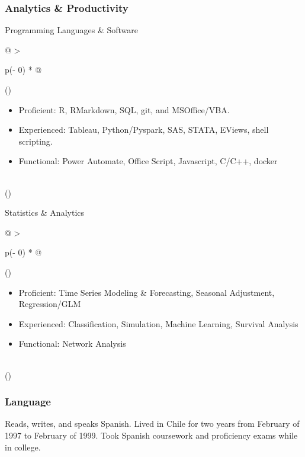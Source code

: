 \documentclass[
  letterpaper,
  DIV=11,
  numbers=noendperiod]{scrartcl}
\providecommand{\tightlist}{%
  \setlength{\itemsep}{0pt}\setlength{\parskip}{0pt}}\usepackage{longtable,booktabs,array}
\begin{document}
\hypertarget{analytics-productivity}{%
\subsubsection{Analytics \& Productivity}\label{analytics-productivity}}

Programming Languages \& Software

\begin{longtable}[]{@{}
  >{\raggedright\arraybackslash}p{(\columnwidth - 0\tabcolsep) * }@{}}
\toprule()
\endhead
\begin{minipage}[t]{\linewidth}\raggedright
\begin{itemize}
\tightlist
\item
  Proficient: R, RMarkdown, SQL, git, and MSOffice/VBA.
\item
  Experienced: Tableau, Python/Pyspark, SAS, STATA, EViews, shell
  scripting.
\item
  Functional: Power Automate, Office Script, Javascript, C/C++, docker
\end{itemize}
\end{minipage} \\
\bottomrule()
\end{longtable}

Statistics \& Analytics

\begin{longtable}[]{@{}
  >{\raggedright\arraybackslash}p{(\columnwidth - 0\tabcolsep) * }@{}}
\toprule()
\endhead
\begin{minipage}[t]{\linewidth}\raggedright
\begin{itemize}
\tightlist
\item
  Proficient: Time Series Modeling \& Forecasting, Seasonal Adjustment,
  Regression/GLM
\item
  Experienced: Classification, Simulation, Machine Learning, Survival
  Analysis
\item
  Functional: Network Analysis
\end{itemize}
\end{minipage} \\
\bottomrule()
\end{longtable}

\hypertarget{language}{%
\subsubsection{Language}\label{language}}

Reads, writes, and speaks Spanish. Lived in Chile for two years from
February of 1997 to February of 1999. Took Spanish coursework and
proficiency exams while in college.
\end{document}
